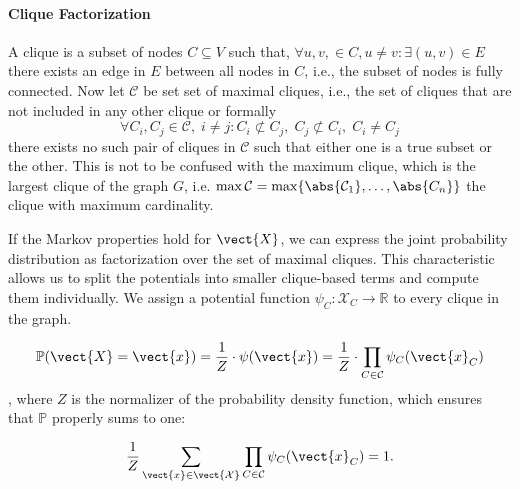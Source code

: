 \paragraph*{Clique Factorization}

A clique is a subset of nodes $C \subseteq V$ such that, $\forall u,v,  \in C, u \neq v: \exists (u,v) \in E$ there exists an edge in $E$ between all nodes in $C$, i.e., the subset of nodes is fully connected.
Now let $\mathcal{C}$ be set set of maximal cliques, i.e., the set of cliques that are not included in any other clique or formally 
\begin{equation}
    \forall C_i, C_j \in \mathcal{C},\; i \neq j  : C_i \not\subset C_j,\; C_j \not\subset C_i,\; C_i \neq C_j
\end{equation}
there exists no such pair of cliques in $\mathcal{C}$ such that either one is a true subset or the other.
This is not to be confused with the maximum clique, which is the largest clique of the graph $G$, i.e. $\max \mathcal{C} = \max \{\abs{\mathcal{C}_1}, \ldots, \abs{C_n}\}$ the clique with maximum cardinality.

If the Markov properties hold for $\vect{X}$, we can express the joint probability distribution as factorization over the set of maximal cliques.
This characteristic allows us to split the potentials into smaller clique-based terms and compute them individually. 
We assign a potential function $\psi_C: \mathcal{X}_C \rightarrow \mathbb{R}$ to every clique in the graph.

\begin{equation}
        \mathbb{P}(\vect{X}=\vect{x}) = \frac{1}{Z} \cdot \psi(\vect{x})= \frac{1}{Z} \cdot \prod_{C \in \mathcal{C}} \psi_C(\vect{x}_C)
\end{equation},
where $Z$ is the normalizer of the probability density function, which ensures that $\mathbb{P}$  properly sums to one:

\begin{equation}
    \frac{1}{Z} \sum_{\vect{x}\in \mathcal{\vect{X}}} \prod_{C \in \mathcal{C}} \psi_C(\vect{x}_C) = 1. 
\end{equation}

